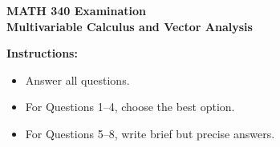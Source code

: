 \documentclass[11pt]{article}
\begin{document}
\begin{center}
  {\Large \textbf{MATH 340 Examination}}\\[0.25em]
  {\large \textbf{Multivariable Calculus and Vector Analysis}}\\[0.5em]
\end{center}

\noindent\textbf{Instructions:}
\begin{itemize}
  \item Answer all questions.
  \item For Questions 1--4, choose the best option.
  \item For Questions 5--8, write brief but precise answers.
\end{itemize}

\vspace{0.5em}
\end{document}
